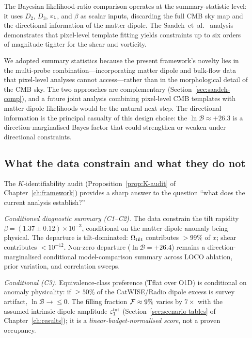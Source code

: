 The Bayesian likelihood-ratio comparison operates at the
summary-statistic level: it uses $D_2$, $D_3$, $\varepsilon_1$, and
$\beta$ as scalar inputs, discarding the full CMB sky map and
the directional information of the matter dipole.  The
Saadeh~et~al.~\cite{Saadeh2016b} analysis demonstrates that
pixel-level template fitting yields constraints up to six orders
of magnitude tighter for the shear and vorticity.

We adopted summary statistics because the present framework's
novelty lies in the multi-probe combination---incorporating
matter dipole and bulk-flow data that pixel-level analyses
cannot access---rather than in the morphological detail of the
CMB sky.  The two approaches are complementary
(Section~\ref{sec:saadeh-comp}), and a future joint analysis
combining pixel-level CMB templates with matter dipole
likelihoods would be the natural next step.  The directional
information is the principal casualty of this design choice:
the $\ln\mathcal{B} \approx +26.3$ is a direction-marginalised
Bayes factor that could strengthen or weaken under directional
constraints.


\subsection{What the data constrain and what they do not}
\label{sec:disc-constraints}

The $K$-identifiability audit
(Proposition~\ref{prop:K-audit} of Chapter~\ref{ch:framework})
provides a sharp answer to the question ``what does the current
analysis establish?''

\emph{Conditioned diagnostic summary (C1--C2).}\quad
The data constrain the tilt rapidity
$\beta = (1.37 \pm 0.12) \times 10^{-3}$, conditional on the
matter-dipole anomaly being physical.  The departure is
tilt-dominated: $\Omega_{\mathrm{tilt}}$ contributes $>99\%$ of $x$; shear
contributes $<10^{-12}$.  Non-zero departure ($\ln\mathcal{B}
= +26.4$) remains a direction-marginalised conditional
model-comparison summary across LOCO ablation, prior variation,
and correlation sweeps.

\emph{Conditional (C3).}\quad
Equivalence-class preference (Tflat over O1D) is conditional on
anomaly physicality: if $\geq 50\%$ of the CatWISE/Radio dipole
excess is survey artifact, $\ln\mathcal{B} \to \leq 0$.  The
filling fraction $\mathcal{F} \approx 9\%$ varies by $7\times$ with the
assumed intrinsic dipole amplitude $\varepsilon_1^{\rm int}$
(Section~\ref{sec:scenario-tables} of
Chapter~\ref{ch:results}); it is a
\emph{linear-budget-normalised score}, not a proven occupancy.

